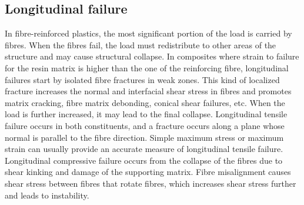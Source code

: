 \documentclass[12pt,twoside]{report}
\begin{document}
\subsection{Longitudinal failure}
\indent\indent\indent  In fibre-reinforced plastics, the most significant portion of the load is carried by fibres. When the fibres fail, the load must redistribute to other areas of the structure and may cause structural collapse. In composites where strain to failure for the resin matrix is higher than the one of the reinforcing fibre, longitudinal failures start by isolated fibre fractures in weak zones. This kind of localized fracture increases the normal and interfacial shear stress in fibres and promotes matrix cracking, fibre matrix debonding, conical shear failures, etc. When the load is further increased, it may lead to the final collapse. Longitudinal tensile failure occurs in both constituents, and a fracture occurs along a plane whose normal is parallel to the fibre direction. Simple maximum stress or maximum strain can usually provide an accurate measure of longitudinal tensile failure. Longitudinal compressive failure occurs from the collapse of the fibres due to shear kinking and damage of the supporting matrix. Fibre misalignment causes shear stress between fibres that rotate fibres, which increases shear stress further and leads to instability. 
 
\end{document}

